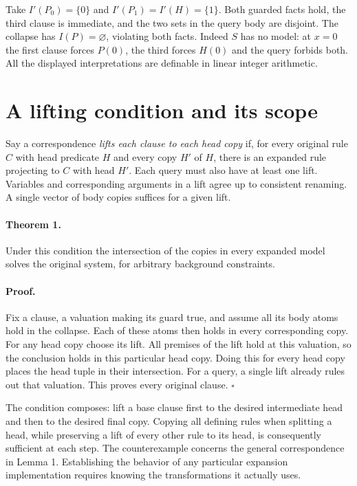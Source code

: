 \documentclass[11pt]{article}
\begin{document}
Take $I'(P_0)=\{0\}$ and $I'(P_1)=I'(H)=\{1\}$. Both guarded facts hold, the third clause is immediate, and the two sets in the query body are disjoint. The collapse has $I(P)=\varnothing$, violating both facts. Indeed $S$ has no model: at $x=0$ the first clause forces $P(0)$, the third forces $H(0)$ and the query forbids both. All the displayed interpretations are definable in linear integer arithmetic.

\section{A lifting condition and its scope}
Say a correspondence \emph{lifts each clause to each head copy} if, for every original rule $C$ with head predicate $H$ and every copy $H'$ of $H$, there is an expanded rule projecting to $C$ with head $H'$. Each query must also have at least one lift. Variables and corresponding arguments in a lift agree up to consistent renaming. A single vector of body copies suffices for a given lift.

\paragraph{Theorem 1.} Under this condition the intersection of the copies in every expanded model solves the original system, for arbitrary background constraints.

\paragraph{Proof.} Fix a clause, a valuation making its guard true, and assume all its body atoms hold in the collapse. Each of these atoms then holds in every corresponding copy. For any head copy choose its lift. All premises of the lift hold at this valuation, so the conclusion holds in this particular head copy. Doing this for every head copy places the head tuple in their intersection. For a query, a single lift already rules out that valuation. This proves every original clause. \hfill$\square$

The condition composes: lift a base clause first to the desired intermediate head and then to the desired final copy. Copying all defining rules when splitting a head, while preserving a lift of every other rule to its head, is consequently sufficient at each step. The counterexample concerns the general correspondence in Lemma 1. Establishing the behavior of any particular expansion implementation requires knowing the transformations it actually uses.
\end{document}
